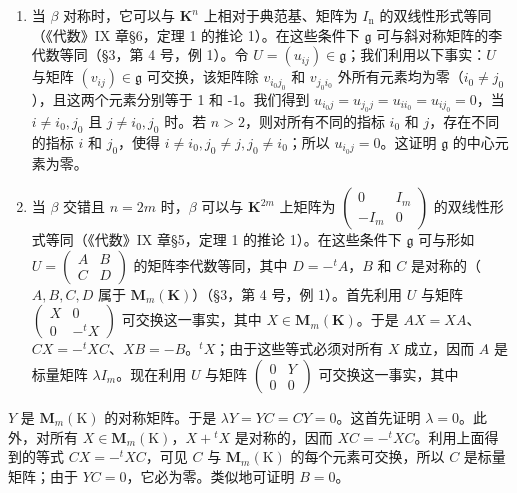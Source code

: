 \begin{enumerate}
\def\labelenumi{(\alph{enumi})}
\item
  当 \(\beta\) 对称时，它可以与 \(\mathbf{K}^n\) 上相对于典范基、矩阵为 \(I_{\mathrm{n}}\) 的双线性形式等同（《代数》IX 章§6，定理 1 的推论 1）。在这些条件下 \(\mathfrak{g}\) 可与斜对称矩阵的李代数等同（§3，第 4 号，例 1）。令 \(U = (u_{ij}) \in \mathfrak{g}\)；我们利用以下事实：\(U\) 与矩阵 \((v_{ij}) \in \mathfrak{g}\) 可交换，该矩阵除 \(v_{i_0j_0}\) 和 \(v_{j_0i_0}\) 外所有元素均为零（\(i_0 \neq j_0\)），且这两个元素分别等于 1 和 -1。我们得到 \(u_{i_0j} = u_{j_0j} = u_{ii_0} = u_{ij_0} = 0\)，当 \(i \neq i_0, j_0\) 且 \(j \neq i_0, j_0\) 时。若 \(n > 2\)，则对所有不同的指标 \(i_0\) 和 \(j\)，存在不同的指标 \(i\) 和 \(j_0\)，使得 \(i \neq i_0, j_0 \neq j, j_0 \neq i_0\)；所以 \(u_{i_0j} = 0\)。这证明 \(\mathfrak{g}\) 的中心元素为零。
\item
  当 \(\beta\) 交错且 \(n = 2m\) 时，\(\beta\) 可以与 \(\mathbf{K}^{2m}\) 上矩阵为 \(\left( \begin{array}{cc}0 & I_m \\ -I_m & 0 \end{array} \right)\) 的双线性形式等同（《代数》IX 章§5，定理 1 的推论 1）。在这些条件下 \(\mathfrak{g}\) 可与形如 \(U = \left( \begin{array}{cc}A & B\\ C & D \end{array} \right)\) 的矩阵李代数等同，其中 \(D = -^t A\)，\(B\) 和 \(C\) 是对称的（\(A, B, C, D\) 属于 \(\mathbf{M}_m(\mathbf{K})\)）（§3，第 4 号，例 1）。首先利用 \(U\) 与矩阵 \(\left( \begin{array}{cc}X & 0 \\ 0 & -^t X \end{array} \right)\) 可交换这一事实，其中 \(X \in \mathbf{M}_m(\mathbf{K})\)。于是 \(AX = X A\)、\(CX = -^t XC\)、\(XB = -B\)。\(^t X\)；由于这些等式必须对所有 \(X\) 成立，因而 \(A\) 是标量矩阵 \(\lambda I_m\)。现在利用 \(U\) 与矩阵 \(\left( \begin{array}{cc}0 & Y \\ 0 & 0 \end{array} \right)\) 可交换这一事实，其中
\end{enumerate}

\(Y\) 是 \(\mathbf{M}_m(\mathrm{K})\) 的对称矩阵。于是 \(\lambda Y = YC = CY = 0\)。这首先证明 \(\lambda = 0\)。此外，对所有 \(X \in \mathbf{M}_m(\mathrm{K})\)，\(X + {}^t X\) 是对称的，因而 \(XC = -{}^t XC\)。利用上面得到的等式 \(CX = -{}^t XC\)，可见 \(C\) 与 \(\mathbf{M}_m(\mathrm{K})\) 的每个元素可交换，所以 \(C\) 是标量矩阵；由于 \(YC = 0\)，它必为零。类似地可证明 \(B = 0\)。

